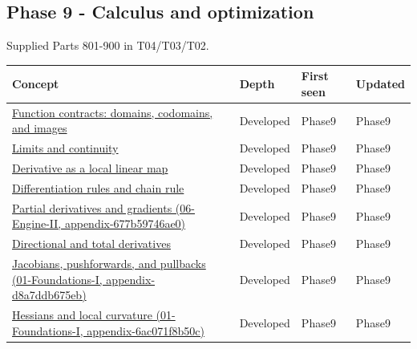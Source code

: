 \subsection{Phase 9 - Calculus and optimization}\label{phase-9---calculus-and-optimization}

Supplied Parts 801-900 in T04/T03/T02.

{\def\LTcaptype{none} %
\begin{longtable}[]{@{}
  >{\raggedright\arraybackslash}p{}
  >{\raggedright\arraybackslash}p{}
  >{\raggedright\arraybackslash}p{}
  >{\raggedright\arraybackslash}p{}@{}}
\toprule\noalign{}
\begin{minipage}[b]{\linewidth}\raggedright
Concept
\end{minipage} & \begin{minipage}[b]{\linewidth}\raggedright
Depth
\end{minipage} & \begin{minipage}[b]{\linewidth}\raggedright
First seen
\end{minipage} & \begin{minipage}[b]{\linewidth}\raggedright
Updated
\end{minipage} \\
\midrule\noalign{}
\endhead
\bottomrule\noalign{}
\endlastfoot
\hyperref[appendix-a59658325cd6]{Function contracts: domains, codomains, and images} & Developed & Phase9 & Phase9 \\
\hyperref[appendix-fecc1847f5a3]{Limits and continuity} & Developed & Phase9 & Phase9 \\
\hyperref[appendix-7bc181935c42]{Derivative as a local linear map} & Developed & Phase9 & Phase9 \\
\hyperref[appendix-d9f70bdfbc92]{Differentiation rules and chain rule} & Developed & Phase9 & Phase9 \\
\href{}{Partial derivatives and gradients (06-Engine-II, appendix-677b59746ae0)} & Developed & Phase9 & Phase9 \\
\hyperref[appendix-e2d476574aab]{Directional and total derivatives} & Developed & Phase9 & Phase9 \\
\href{}{Jacobians, pushforwards, and pullbacks (01-Foundations-I, appendix-d8a7ddb675eb)} & Developed & Phase9 & Phase9 \\
\href{}{Hessians and local curvature (01-Foundations-I, appendix-6ac071f8b50c)} & Developed & Phase9 & Phase9 \\

\end{longtable}}

